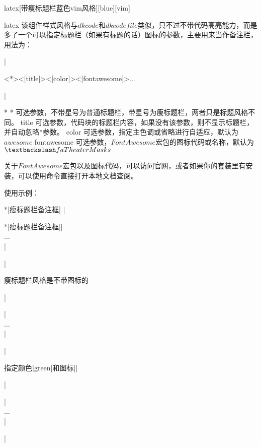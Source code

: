 \begin{dkcode}
\begin{dkcode}{latex}[带瘦标题栏蓝色vim风格][blue][vim]
\begin{dkcode}{latex}
该组件样式风格与$dkcode$和$dkcodefile$类似，只不过不带代码高亮能力，而是多了一个可以指定标题栏（如果有标题的话）图标的参数，主要用来当作备注栏，用法为：

|\begin{dkcomment}<*><[title]><[color]><[fontawesome]>...\end{dkcomment}|

\begin{cvskills}*
  \cvskill
  {*}
  {可选参数，不带星号为普通标题栏，带星号为瘦标题栏，两者只是标题风格不同。}
  \cvskill
  {title}
  {可选参数，代码块的标题栏内容，如果没有该参数，则不显示标题栏，并自动忽略*参数。}
  \cvskill
  {color}
  {可选参数，指定主色调或省略进行自适应，默认为$awesome$}
  \cvskill
  {fontawesome}
  {可选参数，$FontAwesome$宏包的图标代码或名称，默认为$\textbackslash faTheaterMasks$ \faTheaterMasks}
\end{cvskills}

关于$FontAwesome$宏包以及图标代码，可以访问官网，或者如果你的套装里有安装，可以使用命令直接打开本地文档查阅。

使用示例：

\begin{dkcomment}*[瘦标题栏备注框]
  |\begin{dkcomment}*[瘦标题栏备注框]|\\
    ...\\
  |\end{dkcomment}|

  瘦标题栏风格是不带图标的
\end{dkcomment}

\begin{dkcomment}
  |\begin{dkcomment}|\\
    ...\\
  |\end{dkcomment}|

  指定颜色|green|和图标|\faTree|
\end{dkcomment}

\begin{dkcomment}
  |\begin{dkcomment}|\\
    ...\\
  |\end{dkcomment}|


\end{dkcomment}
\end{dkcode}
\end{dkcode}
\end{dkcode}
